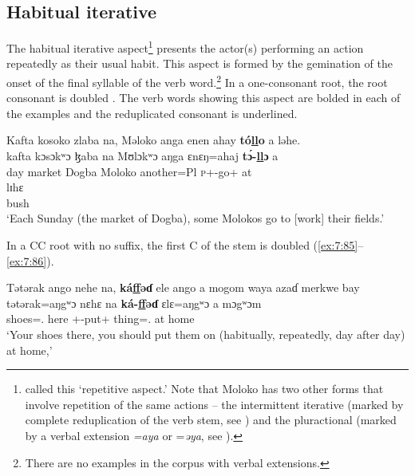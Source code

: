 \subsection{Habitual iterative}\label{sec:7.4.4}
\hypertarget{RefHeading1212281525720847}{}
The habitual iterative aspect\footnote{\citet{FriesenMamalis2008} called this ‘repetitive aspect.’ Note that Moloko has two other forms that involve repetition of the same actions -- the intermittent iterative (marked by complete reduplication of the verb stem, see ) and the pluractional (marked by a verbal extension\textit{ =aya }or =\textit{əya}, see ).} presents the actor(s) performing an action repeatedly as their usual habit. This aspect is formed by the gemination of the onset of the final syllable of the verb word.\footnote{There are no examples in the corpus with verbal extensions.} In a one-consonant root, the root consonant is doubled . The verb words showing this aspect are bolded in each of the examples and the reduplicated consonant is underlined. 

\ea\label{ex:7:84}
Kafta  kosoko  zlaba  na,  Məloko  anga  enen  ahay  \textbf{tó\underline{ll}o}  a  ləhe.\\
\gll  kafta kɔsɔkʷɔ  ɮaba  na  Mʊlɔkʷɔ  aŋga  ɛnɛŋ=ahaj  \textbf{t\'ɔ-\underline{ll}ɔ}    a \\ 
      day    market  Dogba  {\PSP}  Moloko  {\POSS}  another=Pl  \textsc{p}+{\IFV}-go+{\ITR}  at \\ 
      
      \medskip
\gll lɪhɛ\\
     bush\\
\glt  ‘Each Sunday (the market of Dogba), some Molokos go to [work] their fields.’\\
\z 

In a CC root with no suffix, the first C of the stem is doubled (\ref{ex:7:85}--\ref{ex:7:86}).

\ea\label{ex:7:85}
Tətərak  ango  nehe  na,  \textbf{ká\underline{ff}əɗ}  ele  ango  a  mogom waya  azaɗ  merkwe  bay\\
\gll  tətərak=aŋgʷɔ nɛhɛ na \textbf{ká-\underline{ff}əɗ} ɛlɛ=aŋgʷɔ a mɔgʷɔm \\ 
      shoes={\twoS}.{\POSS} here   {\PSP}  {\twoS}+{\IFV}-put+{\ITR}  thing={\twoS}.{\POSS}     at   home\\  
\glt ‘Your shoes there, you should put them on (habitually, repeatedly, day after day) at home,’\\      
      
